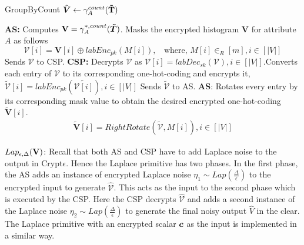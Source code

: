 \begin{algorithm}[t]
\small{
\caption{\textsf{GroupByCount }$\tilde{\boldsymbol{V}} \leftarrow \gamma^{count}_A(\mathbf{\tilde{T}})$}
\begin{algorithmic}[1]
\STATEx \textbf{\textsf{AS}:} \STATE Computes $\mathbf{V}=\gamma^{*,count}_{A}(\boldsymbol{\tilde{T}})$.
\STATE Masks the encrypted histogram $\mathbf{V}$ for attribute $A$ as follows 
$$\boldsymbol{\mathcal{V}}[i]= \mathbf{V}[i] \oplus labEnc_{pk}(M[i]), ~~~~\text{where, }M[i] \in_R [m], i \in [|V|]$$
\STATE Sends $\boldsymbol{\mathcal{V}}$ to \textsf{CSP}.
\STATEx \textbf{\textsf{CSP}:}
\STATE Decrypts  $\boldsymbol{\mathcal{V}}$ as $\mathcal{V}[i]=labDec_{sk}(\boldsymbol{\mathcal{V}}), i \in [|V|]$.\STATE Converts each entry of $\mathcal{V}$ to its corresponding one-hot-coding and encrypts it, $\boldsymbol{\tilde{\mathcal{V}}}[i]=labEnc_{pk}(\tilde{\mathcal{V}[i]}), i \in [|V|]$
\STATE Sends $\boldsymbol{\tilde{\mathcal{V}}}$ to \textsf{AS}.
\STATEx \textbf{\textsf{AS}}:
\STATE  Rotates every entry by its corresponding mask value to obtain the desired  encrypted one-hot-coding $\boldsymbol{\tilde{V}}[i]$. \begin{gather*}\boldsymbol{\tilde{V}}[i]=RightRotate(\boldsymbol{\tilde{\mathcal{V}}},M[i]), i \in [|V|]\end{gather*} 
 \end{algorithmic} \label{groupby-imp}}
\end{algorithm} 


$Lap_{\epsilon,\Delta}(\mathbf{V})$:  Recall that both \textsf{AS} and \textsf{CSP} have to add Laplace noise to the output in Crypt$\epsilon$. Hence the \textsf{Laplace} primitive  has two phases. In the first phase,  the \textsf{AS} adds an instance of encrypted Laplace noise $\eta_1 \sim Lap(\frac{\Delta}{\epsilon})$ to the encrypted input  to generate $\mathbf{\hat{\mathcal{V}}}$. This acts as the input to the second phase which is executed by the \textsf{CSP}. Here the \textsf{CSP} decrypts $\mathbf{\hat{\mathcal{V}}}$ and adds a second instance of the Laplace noise $\eta_2 \sim Lap(\frac{\Delta}{\epsilon})$ to generate the final noisy output $\hat{V}$ in the clear. %
The \textsf{Laplace} primitive with an encrypted scalar $\boldsymbol{c}$ as the input is implemented in a similar way.



